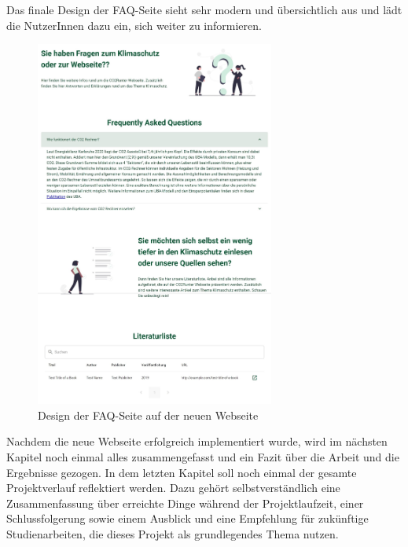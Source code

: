 Das finale Design der FAQ-Seite sieht sehr modern und übersichtlich aus und lädt die NutzerInnen dazu ein, sich weiter zu informieren.

\begin{figure}[H]
    \centering
    \includegraphics[width=0.7\textwidth]{images/06/FAQ-Design.jpeg}
    \caption{Design der FAQ-Seite auf der neuen Webseite}
    \label{fig:new-co2runter-faq-design}
\end{figure}


Nachdem die neue Webseite erfolgreich implementiert wurde, wird im nächsten Kapitel noch einmal alles zusammengefasst und ein Fazit über die Arbeit und die Ergebnisse gezogen. In dem letzten Kapitel soll noch einmal der gesamte Projektverlauf reflektiert werden. Dazu gehört selbstverständlich eine Zusammenfassung über erreichte Dinge während der Projektlaufzeit, einer Schlussfolgerung sowie einem Ausblick und eine Empfehlung für zukünftige Studienarbeiten, die dieses Projekt als grundlegendes Thema nutzen.
